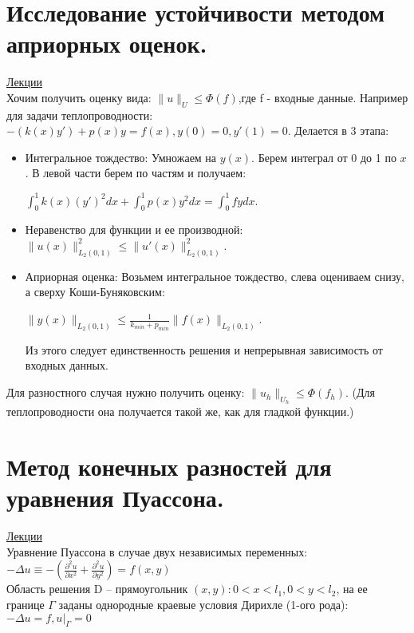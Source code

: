 \documentclass[specialist, subf, href, colorlinks=true, 12pt, times, mtpro, final]{disser}
\theoremstyle{definition}
\begin{document}
{\section {Исследование устойчивости методом априорных оценок.}
    \hyperlink {lects.125}{Лекции}\\
    Хочим получить оценку вида: $\| u\|_{U} \leq \Phi(f)$,где f - входные данные. Например для задачи теплопроводности: $-(k(x)y') + p(x)y = f(x), y(0) = 0, y'(1) = 0$. Делается в 3 этапа:
    \begin{itemize}
    	\item Интегральное тождество: Умножаем на $y(x)$. Берем интеграл от 0 до 1 по $x$. В левой части берем по частям и получаем:
    	\begin{center} $\int^1_0k(x)(y')^2dx + \int^1_0p(x)y^2dx = \int^1_0fydx$. \end{center}
    	\item Неравенство для функции и ее производной: $\| u(x)\|^2_{L_2(0,1)} \leq \| u'(x)\|^2_{L_2(0,1)}$.
    	\item Априорная оценка: Возьмем интегральное тождество, слева оцениваем снизу, а сверху Коши-Буняковским: 
    	\begin{center} $\| y(x)\|_{L_2(0,1)} \leq \frac{1}{k_{min}+p_{min}}\| f(x)\|_{L_2(0,1)}$. \end{center}
    	Из этого следует единственность решения и непрерывная зависимость от входных данных.
    \end{itemize}
    Для разностного случая нужно получить оценку: $\| u_h\|_{U_h} \leq \Phi(f_h)$. (Для теплопроводности она получается такой же, как для гладкой функции.)

\section {Метод конечных разностей для уравнения Пуассона.}
    \hyperlink {lects.128}{Лекции}\\
    
    Уравнение Пуассона в случае двух независимых переменных:\\
    $-\Delta u \equiv - \left(\frac{\partial^2u}{\partial x^2} + \frac{\partial^2 u}{\partial y^2}  \right) = f(x, y)$\\
    
    Область решения D -- прямоугольник $(x,y): 0<x<l_1, 0<y<l_2$, на ее границе $\Gamma$ заданы однородные краевые условия Дирихле (1-ого рода): $-\Delta u = f, u|_{\Gamma} = 0$\\
    
}
\end{document}
